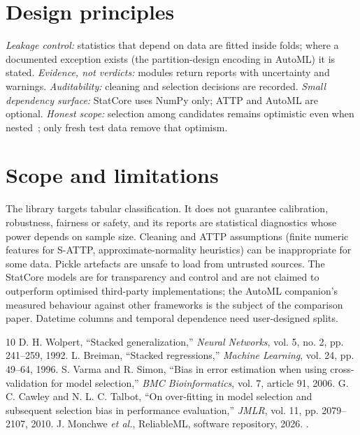 \documentclass[conference]{IEEEtran}
\begin{document}
\section{Design principles}
\emph{Leakage control:} statistics that depend on data are fitted inside folds; where a documented exception exists (the partition-design encoding in AutoML) it is stated. \emph{Evidence, not verdicts:} modules return reports with uncertainty and warnings. \emph{Auditability:} cleaning and selection decisions are recorded. \emph{Small dependency surface:} StatCore uses NumPy only; ATTP and AutoML are optional. \emph{Honest scope:} selection among candidates remains optimistic even when nested~\cite{varma2006,cawley2010}; only fresh test data remove that optimism.

\section{Scope and limitations}
The library targets tabular classification. It does not guarantee calibration, robustness, fairness or safety, and its reports are statistical diagnostics whose power depends on sample size. Cleaning and ATTP assumptions (finite numeric features for S-ATTP, approximate-normality heuristics) can be inappropriate for some data. Pickle artefacts are unsafe to load from untrusted sources. The StatCore models are for transparency and control and are not claimed to outperform optimised third-party implementations; the AutoML companion's measured behaviour against other frameworks is the subject of the comparison paper. Datetime columns and temporal dependence need user-designed splits.

\begin{thebibliography}{10}
 D. H. Wolpert, ``Stacked generalization,'' \emph{Neural Networks}, vol. 5, no. 2, pp. 241--259, 1992.
 L. Breiman, ``Stacked regressions,'' \emph{Machine Learning}, vol. 24, pp. 49--64, 1996.
 S. Varma and R. Simon, ``Bias in error estimation when using cross-validation for model selection,'' \emph{BMC Bioinformatics}, vol. 7, article 91, 2006.
 G. C. Cawley and N. L. C. Talbot, ``On over-fitting in model selection and subsequent selection bias in performance evaluation,'' \emph{JMLR}, vol. 11, pp. 2079--2107, 2010.
 J. Monchwe \emph{et al.}, ReliableML, software repository, 2026. \projecturl.
\end{thebibliography}
\end{document}
